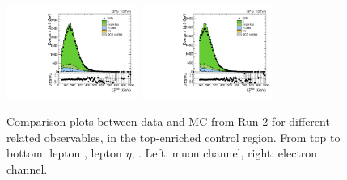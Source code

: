 \begin{figure}[htbp]
  \includegraphics[width=0.3825\textwidth]{fig/controlPlots/CR_b1_mu_allP_allC_allD_Run2_met_pt.pdf}
  \includegraphics[width=0.3825\textwidth]{fig/controlPlots/CR_b1_e_allP_allC_allD_Run2_met_pt.pdf}\\
  \caption{
    Comparison plots between data and MC from Run 2 for different \Wlep-related observables, in the top-enriched control region.
    From top to bottom: lepton \pt, lepton $\eta$, \ptmiss.
    Left: muon channel, right: electron channel.
  }
  \label{fig:CR_controlPlotsRun2_1}
\end{figure}

